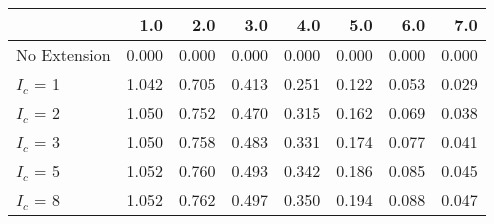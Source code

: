 \begin{tabular}{lrrrrrrr}
\toprule
{} &   1.0 &   2.0 &   3.0 &   4.0 &   5.0 &   6.0 &   7.0 \\
\midrule
No Extension & 0.000 & 0.000 & 0.000 & 0.000 & 0.000 & 0.000 & 0.000 \\
$I_c$ = 1    & 1.042 & 0.705 & 0.413 & 0.251 & 0.122 & 0.053 & 0.029 \\
$I_c$ = 2    & 1.050 & 0.752 & 0.470 & 0.315 & 0.162 & 0.069 & 0.038 \\
$I_c$ = 3    & 1.050 & 0.758 & 0.483 & 0.331 & 0.174 & 0.077 & 0.041 \\
$I_c$ = 5    & 1.052 & 0.760 & 0.493 & 0.342 & 0.186 & 0.085 & 0.045 \\
$I_c$ = 8    & 1.052 & 0.762 & 0.497 & 0.350 & 0.194 & 0.088 & 0.047 \\
\bottomrule
\end{tabular}
